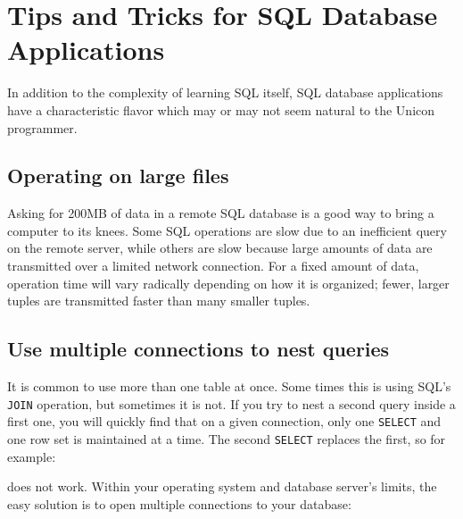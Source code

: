 \section{Tips and Tricks for SQL Database Applications}

In addition to the complexity of learning SQL itself, SQL database
applications have a characteristic flavor which may or may not seem
natural to the Unicon programmer.

\subsection{Operating on large files}

Asking for 200MB of data in a remote SQL database is a good way to
bring a computer to its knees. Some SQL operations are slow due to an
inefficient query on the remote server, while others are slow because
large amounts of data are transmitted over a limited network
connection. For a fixed amount of data, operation time will vary
radically depending on how it is organized; fewer, larger tuples are
transmitted faster than many smaller tuples.

\subsection{Use multiple connections to nest queries}

It is common to use more than one table at once. Some times this is
using SQL's \texttt{JOIN} operation, but sometimes it
is not. If you try to nest a second query inside a first one, you will
quickly find that on a given connection, only one \texttt{SELECT} and
one row set is maintained at a time. The second \texttt{SELECT}
replaces the first, so for example:


\noindent
does not work. Within your operating system and database
server's limits, the easy solution is to open multiple
connections to your database:


